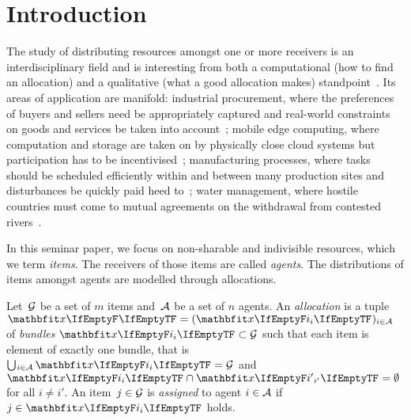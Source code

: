 \section{Introduction}
\label{sec:intro}

The study of distributing resources amongst one or more receivers is an interdisciplinary field and is interesting from both a computational (how to find an allocation) and a qualitative (what a good allocation makes) standpoint~\cite{survey}.
Its areas of application are mani\-fold:
industrial procurement, where the preferences of buyers and sellers need be appropriately captured and real-world constraints on goods and services be taken into account~\cite{survey};
mobile edge computing, where computation and storage are taken on by physically close cloud systems but participation has to be incentivised~\cite{edge_computing_auction, edge_computing_report};
manufacturing processes, where tasks should be scheduled efficiently within and between many production sites and disturbances be quickly paid heed to~\cite{survey};
water management, where hostile countries must come to mutual agreements on the withdrawal from contested rivers~\cite{water_management}.

In this seminar paper, we focus on non-sharable and indivisible resources, which we term \emph{items}.
The receivers of those items are called \emph{agents}.
The distributions of items amongst agents are modelled through allocations.
\begin{definition}
	Let~\(\mathcal{G}\) be a set of \(m\) items and~\(\mathcal{A}\) be a set of \(n\) agents.
	An \emph{allocation} is a tuple \(\alloc[][] = (\alloc)_{i \in \agents}\) of \emph{bundles} \(\alloc \subset \goods\) such that each item is element of exactly one bundle, that is \(\mathop{\bigcup\hspace{-1pt}_{i \in \agents}} \alloc = \goods\) and \(\alloc \cap \alloc[][i'] = \emptyset\) for all \(i \neq i'\).
	An item~\(j \in \mathcal{G}\) is \emph{assigned} to agent \(i \in \mathcal{A}\) if \(j \in \alloc\) holds.
\end{definition}

